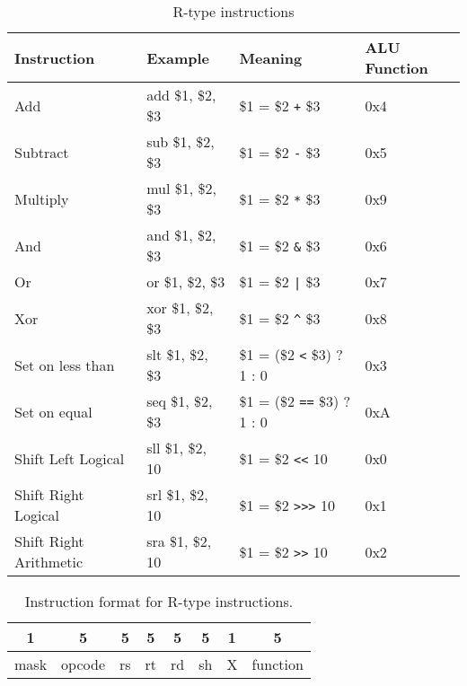 \documentclass[../main/report.tex]{subfiles}
\begin{document}
\begin{table}[H]
    \centering
    \begin{tabular}{llll}
    \textbf{Instruction}   & \textbf{Example}  & \textbf{Meaning}          & \textbf{ALU Function} \\
    \hline
    \hline
    Add                    & add \$1, \$2, \$3 & \$1 = \$2 \verb/+/ \$3    & 0x4          \\
    Subtract               & sub \$1, \$2, \$3 & \$1 = \$2 \verb/-/ \$3    & 0x5          \\
    Multiply               & mul \$1, \$2, \$3 & \$1 = \$2 \verb/*/ \$3    & 0x9          \\ \hline
    And                    & and \$1, \$2, \$3 & \$1 = \$2 \verb/&/ \$3    & 0x6          \\
    Or                     & or \$1, \$2, \$3  & \$1 = \$2 \verb/|/ \$3    & 0x7          \\
    Xor                    & xor \$1, \$2, \$3 & \$1 = \$2 \verb/^/ \$3    & 0x8          \\ \hline
    Set on less than       & slt \$1, \$2, \$3 & \$1 = (\$2 \verb/</ \$3) ? 1 : 0 & 0x3   \\
    Set on equal           & seq \$1, \$2, \$3 & \$1 = (\$2 \verb/==/ \$3) ? 1 : 0 & 0xA  \\ \hline
    Shift Left Logical     & sll \$1, \$2, 10  & \$1 = \$2 \verb/<</ 10    & 0x0          \\
    Shift Right Logical    & srl \$1, \$2, 10  & \$1 = \$2 \verb/>>>/ 10   & 0x1          \\
    Shift Right Arithmetic & sra \$1, \$2, 10  & \$1 = \$2 \verb/>>/ 10    & 0x2          \\
    \end{tabular}
    \caption{R-type instructions}
    \label{table:r_type_instructions}
\end{table}

\begin{table}[H]
    \centering
    \begin{tabular}{|c|c|c|c|c|c|c|c|}
    \multicolumn{1}{c}{1} & \multicolumn{1}{c}{5} & \multicolumn{1}{c}{5}  & \multicolumn{1}{c}{5}  & \multicolumn{1}{c}{5} & \multicolumn{1}{c}{5} & \multicolumn{1}{c}{1} & \multicolumn{1}{c}{5}    \\ \hline
    mask & opcode & rs & rt & rd & sh & X & function \\ \hline
    \end{tabular}
    \caption{Instruction format for R-type instructions.}
    \label{table:r_type_format}
\end{table}
\end{document}
